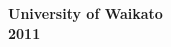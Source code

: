 \begin{titlepage}
\begin{center}
\textbf{University of Waikato}\\
\textbf{ \medskip{}
2011}
\par\end{center}

\end{titlepage}

